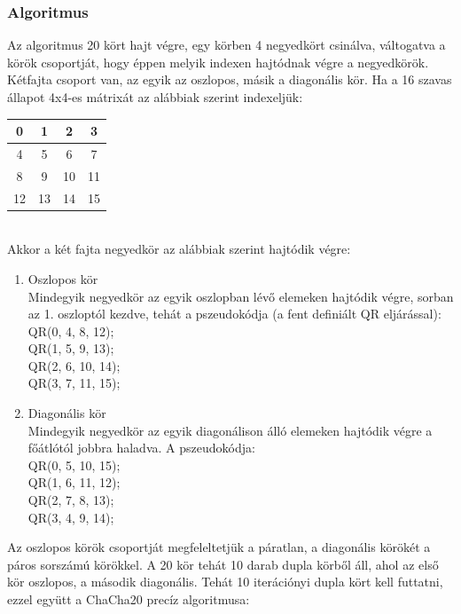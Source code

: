 \documentclass[12pt]{article}
\begin{document}
	\subsubsection*{Algoritmus}
	
	Az algoritmus 20 kört hajt végre, egy körben 4 negyedkört csinálva, váltogatva a körök csoportját, hogy éppen melyik indexen hajtódnak végre a negyedkörök. Kétfajta csoport van, az egyik az oszlopos, másik a diagonális kör. Ha a 16 szavas állapot 4x4-es mátrixát az alábbiak szerint indexeljük:
	\begin{table}
		[h]
		\centering
		\begin{tabular}{|c|c|c|c|}
			\hline
			0&1&2&3\\\hline
			4&5&6&7\\\hline
			8&9&10&11\\\hline
			12&13&14&15 \\\hline
		\end{tabular}
	\end{table}
	\\
	Akkor a két fajta negyedkör az alábbiak szerint hajtódik végre:
	\begin{enumerate}
		\bfseries\item Oszlopos kör \\
		\normalfont Mindegyik negyedkör az egyik oszlopban lévő elemeken hajtódik végre, sorban az 1. oszloptól kezdve, tehát a pszeudokódja (a fent definiált QR eljárással):
		\\QR(0, 4, 8, 12); \\
		QR(1, 5, 9, 13); \\
		QR(2, 6, 10, 14); \\
		QR(3, 7, 11, 15);
		\bfseries \item Diagonális kör \\
		\normalfont Mindegyik negyedkör az egyik diagonálison álló elemeken hajtódik végre a főátlótól jobbra haladva. A pszeudokódja:
	    \\QR(0, 5, 10, 15); \\
	    QR(1, 6, 11, 12); \\
	    QR(2, 7,  8, 13); \\
	    QR(3, 4,  9, 14); \\
	\end{enumerate}
	Az oszlopos körök csoportját megfeleltetjük a páratlan, a diagonális körökét a páros sorszámú körökkel. A 20 kör tehát 10 darab dupla körből áll, ahol az első kör oszlopos, a második diagonális. Tehát 10 iterációnyi dupla kört kell futtatni, ezzel együtt a ChaCha20 precíz algoritmusa:
\end{document}

